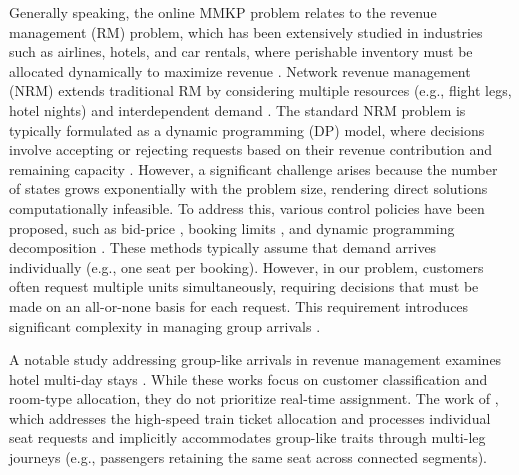 Generally speaking, the online MMKP problem relates to the revenue management (RM) problem, which has been extensively studied in industries such as airlines, hotels, and car rentals, where perishable inventory must be allocated dynamically to maximize revenue \citep{van2005introduction}. Network revenue management (NRM) extends traditional RM by considering multiple resources (e.g., flight legs, hotel nights) and interdependent demand \citep{williamson1992airline}. The standard NRM problem is typically formulated as a dynamic programming (DP) model, where decisions involve accepting or rejecting requests based on their revenue contribution and remaining capacity \citep{talluri1998analysis}. However, a significant challenge arises because the number of states grows exponentially with the problem size, rendering direct solutions computationally infeasible. To address this, various control policies have been proposed, such as bid-price \citep{adelman2007dynamic, bertsimas2003revenue}, booking limits \citep{gallego1997multiproduct}, and dynamic programming decomposition \citep{talluri2006theory, liu2008choice}. These methods typically assume that demand arrives individually (e.g., one seat per booking). However, in our problem, customers often request multiple units simultaneously, requiring decisions that must be made on an all-or-none basis for each request. This requirement introduces significant complexity in managing group arrivals \citep{talluri2006theory}.


A notable study addressing group-like arrivals in revenue management examines hotel multi-day stays \citep{bitran1995application, goldman2002models, aydin2018decomposition}. While these works focus on customer classification and room-type allocation, they do not prioritize real-time assignment. The work of \cite{zhu2023assign}, which addresses the high-speed train ticket allocation and processes individual seat requests and implicitly accommodates group-like traits through multi-leg journeys (e.g., passengers retaining the same seat across connected segments).